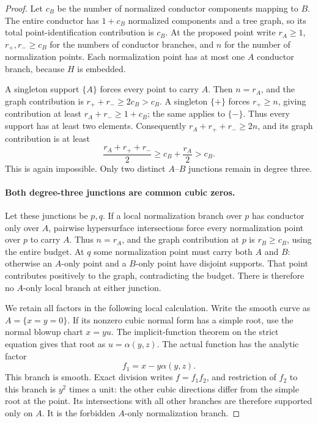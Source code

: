\begin{proof}
Let $c_B$ be the number of normalized conductor components
mapping to $B$. The entire conductor has $1+c_B$
normalized components and a tree graph, so its total
point-identification contribution is $c_B$. At the proposed
point write $r_A\ge1$, $r_+,r_-\ge c_B$ for the numbers
of conductor branches, and $n$ for the number of normalization
points. Each normalization point has at most one $A$
conductor branch, because $H$ is embedded.

A singleton support $\{A\}$ forces every point to carry
$A$. Then $n=r_A$, and the graph contribution is
$r_++r_-\ge2c_B>c_B$. A singleton $\{+\}$ forces
$r_+\ge n$, giving contribution at least
$r_A+r_-\ge1+c_B$; the same applies to $\{-\}$.
Thus every support has at least two elements. Consequently
$r_A+r_++r_-\ge2n$, and its graph contribution is at least
\[
       \frac{r_A+r_++r_-}{2}
                         \ge c_B+\frac{r_A}{2}>c_B.
\]
This is again impossible. Only two distinct $A$--$B$
junctions remain in degree three.

\paragraph{Both degree-three junctions are common cubic zeros.}
Let these junctions be $p,q$. If a local normalization
branch over $p$ has conductor only over $A$, pairwise
hypersurface intersections force every normalization point
over $p$ to carry $A$. Thus $n=r_A$, and the graph
contribution at $p$ is $r_B\ge c_B$, using the entire
budget. At $q$ some normalization point must carry both
$A$ and $B$: otherwise an $A$-only point and a $B$-only
point have disjoint supports. That point contributes
positively to the graph, contradicting the budget. There
is therefore no $A$-only local branch at either junction.

We retain all factors in the following local calculation.
Write the smooth curve as $A=\{x=y=0\}$. If its nonzero
cubic normal form has a simple root, use the normal blowup
chart $x=yu$. The implicit-function theorem on the strict
equation gives that root as $u=\alpha(y,z)$. The actual
function has the analytic factor
\[
                         f_1=x-y\alpha(y,z).
\]
This branch is smooth. Exact division writes $f=f_1f_2$,
and restriction of $f_2$ to this branch is $y^2$ times a
unit: the other cubic directions differ from the simple
root at the point. Its intersections with all other
branches are therefore supported only on $A$. It is the
forbidden $A$-only normalization branch.


\end{proof}
